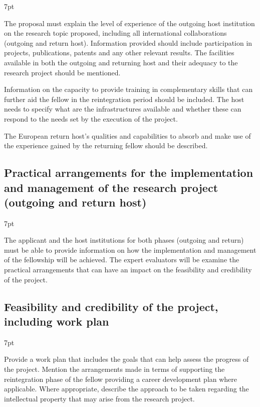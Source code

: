 \documentclass[11pt]{ltxdoc}
\newenvironment{formal}{%
  \def\FrameCommand{%
    \hspace{1pt}%
    {\color{darkblue}\vrule width 2pt}%
    {\color{formalshade}\vrule width 4pt}%
    \colorbox{formalshade}%
  }%
  \MakeFramed{\advance\hsize-\width\FrameRestore}%
  \noindent\hspace{-4.55pt}%
  \begin{adjustwidth}{}{7pt}%
  \vspace{2pt}\vspace{2pt}%
}
{%
  \vspace{2pt}\end{adjustwidth}\endMakeFramed%
}
\begin{document}
\begin{formal}
  The proposal must explain the level of experience of the outgoing
  host institution on the research topic proposed, including all
  international collaborations (outgoing and return host). Information
  provided should include participation in projects, publications,
  patents and any other relevant results. The facilities available in
  both the outgoing and returning host and their adequacy to the
  research project should be mentioned.
 
  Information on the capacity to provide training in complementary
  skills that can further aid the fellow in the reintegration period
  should be included. The host needs to specify what are the
  infrastructures available and whether these can respond to the needs
  set by the execution of the project.
 
  The European return host's qualities and capabilities to absorb and
  make use of the experience gained by the returning fellow should be
  described.
\end{formal}

\subsection{Practical arrangements for the implementation and
  management of the research project (outgoing and return host)}

\begin{formal}
  The applicant and the host institutions for both phases (outgoing
  and return) must be able to provide information on how the
  implementation and management of the fellowship will be
  achieved. The expert evaluators will be examine the practical
  arrangements that can have an impact on the feasibility and
  credibility of the project.
\end{formal}

\subsection{Feasibility and credibility of the project, including work plan}

\begin{formal}
  Provide a work plan that includes the goals that can help assess the
  progress of the project.  Mention the arrangements made in terms of
  supporting the reintegration phase of the fellow providing a career
  development plan where applicable. Where appropriate, describe the
  approach to be taken regarding the intellectual property that may
  arise from the research project.
\end{formal}
\end{document}
